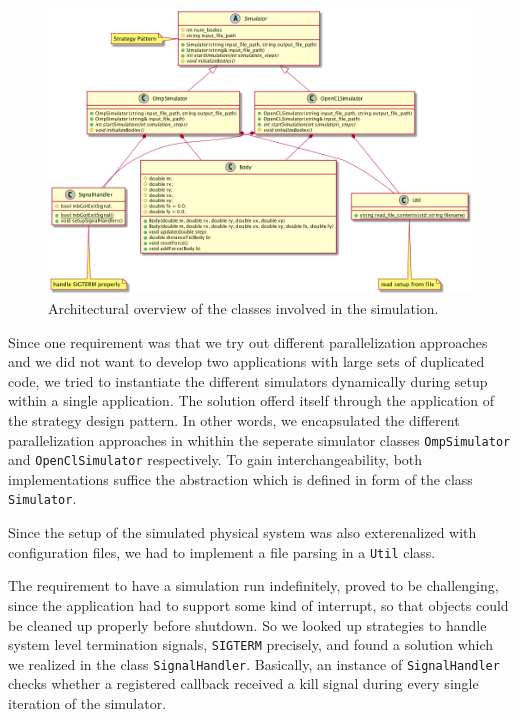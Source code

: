 \documentclass[a4paper,11pt]{scrartcl} %
\begin{document}
\begin{figure}[h!]
	\centering
	\includegraphics[width=\textwidth]{img/classes.png}
	\caption{Architectural overview of the classes involved in the simulation.}
	\label{fig:classes}
\end{figure}

Since one requirement was that we try out different parallelization approaches and we did not want to develop two applications with large sets of duplicated code, we tried to instantiate the different simulators dynamically during setup within a single application. The solution offerd itself through the application of the strategy design pattern. In other words, we encapsulated the different parallelization approaches in whithin the seperate simulator classes \texttt{OmpSimulator} and \texttt{OpenClSimulator} respectively. To gain interchangeability, both implementations suffice the abstraction which is defined in form of the class \texttt{Simulator}.

Since the setup of the simulated physical system was also exterenalized with configuration files, we had to implement a file parsing in a \texttt{Util} class.

The requirement to have a simulation run indefinitely, proved to be challenging, since the application had to support some kind of interrupt, so that objects could be cleaned up properly before shutdown. So we looked up strategies to handle system level termination signals, \texttt{SIGTERM} precisely, and found a solution which we realized in the class \texttt{SignalHandler}. Basically, an instance of \texttt{SignalHandler} checks whether a registered callback received a kill signal during every single iteration of the simulator.
\end{document}

